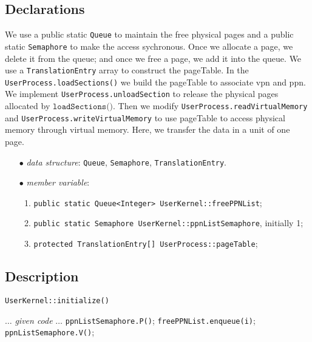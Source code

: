 \documentclass{article}
\begin{document}
\begin{spacing}{1.1}
\subsection{Declarations}
We use a public static \texttt{Queue} to maintain the free physical pages and a public
static \texttt{Semaphore} to make the access sychronous. Once we allocate a
page, we delete it from the queue; and once we free a page, we add it
into the queue. We use a 
\texttt{TranslationEntry} array to construct the pageTable. In the 
\texttt{UserProcess.loadSections()} we build the pageTable to associate vpn and ppn.
We implement \texttt{UserProcess.unloadSection} to release the physical pages
allocated by $\texttt{loadSections()}$.
Then we modify \texttt{UserProcess.readVirtualMemory} and 
\texttt{UserProcess.writeVirtualMemory} to use pageTable to access physical
memory through virtual memory. Here, we transfer the data in a unit of one page.
\begin{enumerate}
  \item[$\bullet$] \textit{data structure}: \texttt{Queue}, \texttt{Semaphore},
    \texttt{TranslationEntry}.
  \item[$\bullet$] \textit{member variable}:
    \begin{enumerate}
      \item \texttt{public static Queue<Integer> UserKernel::freePPNList};
      \item \texttt{public static Semaphore UserKernel::ppnListSemaphore}, initially 1;
      \item \texttt{protected TranslationEntry[] UserProcess::pageTable};
      \end{enumerate}
\end{enumerate}

\subsection{Description}
\begin{algorithm}[htbp]
  \caption{\texttt{UserKernel::initialize()}}
  \begin{algorithmic}[1]
    \State $\dots$ \textit{given code} $\dots$
    \State \texttt{ppnListSemaphore.P()};
    \State \texttt{freePPNList.enqueue(i)};
    \EndFor
    \State \texttt{ppnListSemaphore.V()};
  \end{algorithmic}
\end{algorithm}


\end{spacing}
\end{document}
